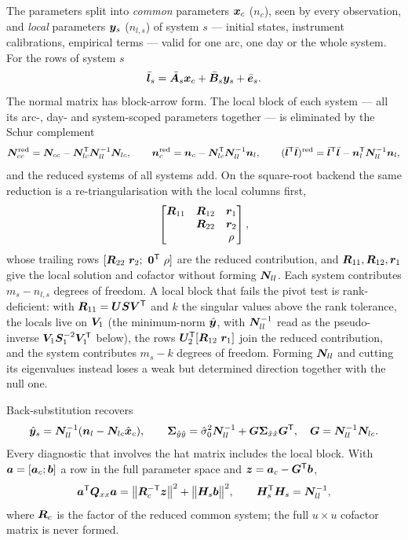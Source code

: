 The parameters split into \emph{common} parameters $\bm{x}_c$ ($n_c$), seen by every observation,
and \emph{local} parameters $\bm{y}_s$ ($n_{l,s}$) of system $s$ --- initial states, instrument
calibrations, empirical terms --- valid for one arc, one day or the whole system. For the rows of
system $s$
\begin{equation}\label{eq:blockarrow}
\bar{\bm{l}}_s=\bar{\bm{A}}_s\bm{x}_c+\bar{\bm{B}}_s\bm{y}_s+\bar{\bm{e}}_s .
\end{equation}
The normal matrix has block-arrow form. The local block of each system --- all its arc-, day-
and system-scoped parameters together --- is eliminated by the Schur complement
\begin{equation}\label{eq:schur}
\bm{N}_{cc}^{\mathrm{red}}=\bm{N}_{cc}-\bm{N}_{lc}^{\mathsf T}\bm{N}_{ll}^{-1}\bm{N}_{lc},\qquad
\bm{n}_c^{\mathrm{red}}=\bm{n}_c-\bm{N}_{lc}^{\mathsf T}\bm{N}_{ll}^{-1}\bm{n}_l,\qquad
(\bar{\bm{l}}^{\mathsf T}\bar{\bm{l}})^{\mathrm{red}}=\bar{\bm{l}}^{\mathsf T}\bar{\bm{l}}-\bm{n}_l^{\mathsf T}\bm{N}_{ll}^{-1}\bm{n}_l ,
\end{equation}
and the reduced systems of all systems add. On the square-root backend the same reduction is a
re-triangularisation with the local columns first,
\[
\begin{bmatrix}\bm{R}_{11}&\bm{R}_{12}&\bm{r}_1\\ & \bm{R}_{22}&\bm{r}_2\\ && \rho\end{bmatrix},
\]
whose trailing rows $[\bm{R}_{22}\ \bm{r}_2;\ \bm{0}^{\mathsf T}\ \rho]$ are the reduced contribution, and
$\bm{R}_{11},\bm{R}_{12},\bm{r}_1$ give the local solution and cofactor without forming
$\bm{N}_{ll}$. Each system contributes $m_s-n_{l,s}$ degrees of freedom. A local block that fails
the pivot test is rank-deficient: with $\bm{R}_{11}=\bm{U}\bm{S}\bm{V}^{\mathsf T}$ and $k$ the singular values
above the rank tolerance, the locals live on $\bm{V}_1$ (the minimum-norm $\hat{\bm{y}}$, with
$\bm{N}_{ll}^{-1}$ read as the pseudo-inverse $\bm{V}_1\bm{S}_1^{-2}\bm{V}_1^{\mathsf T}$ below), the rows
$\bm{U}_2^{\mathsf T}[\bm{R}_{12}\ \bm{r}_1]$ join the reduced contribution, and the system contributes
$m_s-k$ degrees of freedom. Forming $\bm{N}_{ll}$ and cutting its eigenvalues instead loses a
weak but determined direction together with the null one.

Back-substitution recovers
\begin{equation}\label{eq:backsub}
\hat{\bm{y}}_s=\bm{N}_{ll}^{-1}(\bm{n}_l-\bm{N}_{lc}\hat{\bm{x}}_c),\qquad
\bm{\Sigma}_{\hat y\hat y}=\hat\sigma_0^2\bm{N}_{ll}^{-1}+\bm{G}\bm{\Sigma}_{\hat x\hat x}\bm{G}^{\mathsf T},\quad
\bm{G}=\bm{N}_{ll}^{-1}\bm{N}_{lc}.
\end{equation}
Every diagnostic that involves the hat matrix includes the local block. With
$\bm{a}=[\bm{a}_c;\bm{b}]$ a row in the full parameter space and $\bm{z}=\bm{a}_c-\bm{G}^{\mathsf T}\bm{b}$,
\begin{equation}\label{eq:leverage}
\bm{a}^{\mathsf T}\bm{Q}_{xx}\bm{a}=\bigl\|\bm{R}_c^{-\mathsf T}\bm{z}\bigr\|^2+\bigl\|\bm{H}_s\bm{b}\bigr\|^2,\qquad
\bm{H}_s^{\mathsf T}\bm{H}_s=\bm{N}_{ll}^{-1},
\end{equation}
where $\bm{R}_c$ is the factor of the reduced common system; the full $u\times u$ cofactor matrix
is never formed.

